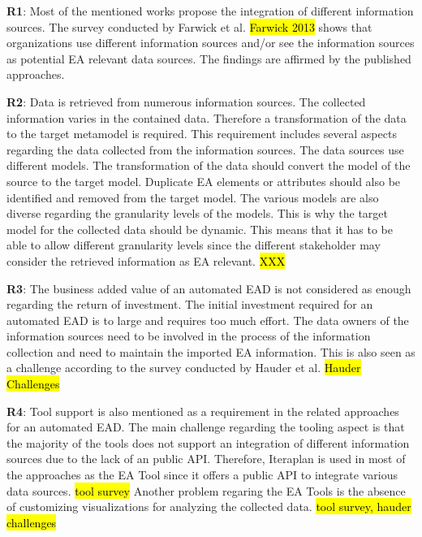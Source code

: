 \textbf{R1}: Most of the mentioned works propose the integration of different information sources. The survey conducted by Farwick et al. \hl{Farwick 2013} shows that organizations use different information sources and/or see the information sources as potential EA relevant data sources. The findings are affirmed by the published approaches.

\textbf{R2}: Data is retrieved from numerous information sources. The collected information varies in the contained data. Therefore a transformation of the data to the target metamodel is required. This requirement includes several aspects regarding the data collected from the information sources. The data sources use different models. The transformation of the data should convert the model of the source to the target model. Duplicate EA elements or attributes should also be identified and removed from the target model. The various models are also diverse regarding the granularity levels of the models. This is why the target model for the collected data should be dynamic. This means that it has to be able to allow different granularity levels since the different stakeholder may consider the retrieved information as EA relevant. \hl{XXX}

\textbf{R3}: The business added value of an automated EAD is not considered as enough regarding the return of investment. The initial investment required for an automated EAD is to large and requires too much effort. The data owners of the information sources need to be involved in the process of the information collection and need to maintain the imported EA information. This is also seen as a challenge according to the survey conducted by Hauder et al. \hl{Hauder Challenges}

\textbf{R4}: Tool support is also mentioned as a requirement in the related approaches for an automated EAD. The main challenge regarding the tooling aspect is that the majority of the tools does not support an integration of different information sources due to the lack of an public API. Therefore, Iteraplan is used in most of the approaches as the EA Tool since it offers a public API to integrate various data sources. \hl{tool survey} Another problem regaring the EA Tools is the absence of customizing visualizations for analyzing the collected data. \hl{tool survey, hauder challenges} 

